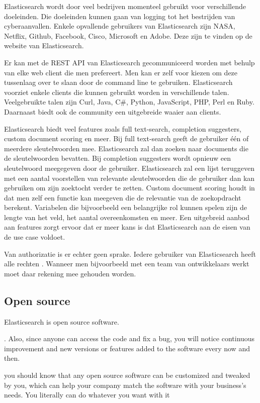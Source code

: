 Elasticsearch wordt door veel bedrijven momenteel gebruikt voor verschillende doeleinden. Die doeleinden kunnen gaan van logging tot het bestrijden van cyberaanvallen. Enkele opvallende gebruikers van Elasticsearch zijn NASA, Netflix, Github, Facebook, Cisco, Microsoft en Adobe. Deze zijn te vinden op de website van Elasticsearch.

Er kan met de REST API van Elasticsearch gecommuniceerd worden met behulp van elke web client die men prefereert. Men kan er zelf voor kiezen om deze tussenlaag over te slaan door de command line te gebruiken. Elasticsearch voorziet enkele clients die kunnen gebruikt worden in verschillende talen. Veelgebruikte talen zijn Curl, Java, C\#, Python, JavaScript, PHP, Perl en Ruby. Daarnaast biedt ook de community een uitgebreide waaier aan clients.

Elasticsearch biedt veel features zoals full text-search, completion suggesters, custom document scoring en meer. Bij full text-search geeft de gebruiker één of meerdere sleutelwoorden mee. Elasticsearch zal dan zoeken naar documents die de sleutelwoorden bevatten. Bij completion suggesters wordt opnieuw een sleutelwoord meegegeven door de gebruiker. Elasticsearch zal een lijst teruggeven met een aantal voorstellen van relevante sleutelwoorden die de gebruiker dan kan gebruiken om zijn zoektocht verder te zetten. Custom document scoring houdt in dat men zelf een functie kan meegeven die de relevantie van de zoekopdracht berekent. Variabelen die bijvoorbeeld een belangrijke rol kunnen spelen zijn de lengte van het veld, het aantal overeenkomsten en meer. Een uitgebreid aanbod aan features zorgt ervoor dat er meer kans is dat Elasticsearch aan de eisen van de use case voldoet. 

Van authorizatie is er echter geen sprake. Iedere gebruiker van Elasticsearch heeft alle rechten \autocite{Brasetvik2013}. Wanneer men bijvoorbeeld met een team van ontwikkelaars werkt moet daar rekening mee gehouden worden.

\subsection{Open source}

Elasticsearch is open source software.

. Also, since anyone can access the code and fix a bug, you will notice continuous improvement and new versions or features added to the software every now and then.

you should know that any open source software can be customized and tweaked by you, which can help your company match the software with your business’s needs. You literally can do whatever you want with it 

